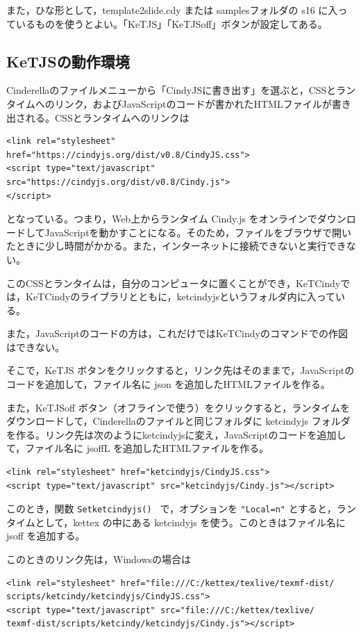 \documentclass[papersize,a4paper,12pt,uplatex]{jsarticle}
\begin{document}
また，ひな形として，template2slide.cdy または samplesフォルダの s16 に入っているものを使うとよい。「KeTJS」「KeTJSoff」ボタンが設定してある。

\subsection{KeTJSの動作環境}

Cinderellaのファイルメニューから「CindyJSに書き出す」を選ぶと，CSSとランタイムへのリンク，およびJavaScriptのコードが書かれたHTMLファイルが書き出される。CSSとランタイムへのリンクは

\begin{verbatim}
<link rel="stylesheet" href="https://cindyjs.org/dist/v0.8/CindyJS.css">
<script type="text/javascript" src="https://cindyjs.org/dist/v0.8/Cindy.js">
</script>
\end{verbatim}
    
となっている。つまり，Web上からランタイム Cindy.js をオンラインでダウンロードしてJavaScriptを動かすことになる。そのため，ファイルをブラウザで開いたときに少し時間がかかる。また，インターネットに接続できないと実行できない。

このCSSとランタイムは，自分のコンピュータに置くことができ，KeTCindyでは，KeTCindyのライブラリとともに，ketcindyjsというフォルダ内に入っている。

また，JavaScriptのコードの方は，これだけではKeTCindyのコマンドでの作図はできない。

そこで，KeTJS ボタンをクリックすると，リンク先はそのままで，JavaScriptのコードを追加して，ファイル名に json を追加したHTMLファイルを作る。

また，KeTJSoff ボタン（オフラインで使う）をクリックすると，ランタイムをダウンロードして，Cinderellaのファイルと同じフォルダに ketcindyjs フォルダを作る。リンク先は次のようにketcindyjsに変え，JavaScriptのコードを追加して，ファイル名に jsoffL を追加したHTMLファイルを作る。

\begin{verbatim}
<link rel="stylesheet" href="ketcindyjs/CindyJS.css">
<script type="text/javascript" src="ketcindyjs/Cindy.js"></script>
\end{verbatim}

このとき，関数 \verb|Setketcindyjs() | で，オプションを \verb|"Local=n"| とすると，ランタイムとして，kettex の中にある ketcindyjs を使う。このときはファイル名に jsoff を追加する。

このときのリンク先は，Windowsの場合は

\begin{verbatim}
<link rel="stylesheet" href="file:///C:/kettex/texlive/texmf-dist/
scripts/ketcindy/ketcindyjs/CindyJS.css">
<script type="text/javascript" src="file:///C:/kettex/texlive/
texmf-dist/scripts/ketcindy/ketcindyjs/Cindy.js"></script>
\end{verbatim}
\end{document}
